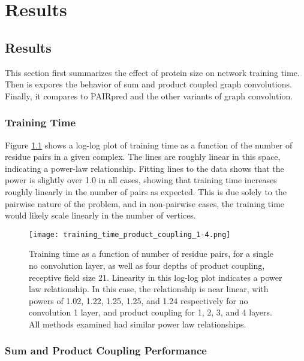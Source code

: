 \chapter{Results}
\label{chap:results}





\section{Results}

This section first summarizes the effect of protein size on network training time.
Then is expores the behavior of sum and product coupled graph convolutions.
Finally, it compares to PAIRpred and the other variants of graph convolution.


\subsection{Training Time}

Figure \ref{fig:train_times} shows a log-log plot of training time as a function of the number of residue pairs in a given complex.
The lines are roughly linear in this space, indicating a power-law relationship.
Fitting lines to the data shows that the power is slightly over 1.0 in all cases, showing that training time increases roughly linearly in the number of pairs as expected.
This is due solely to the pairwise nature of the problem, and in non-pairwise cases, the training time would likely scale linearly in the number of vertices.


\begin{figure}
	\texttt{[image: training\_time\_product\_coupling\_1-4.png]}
	\caption{Training time as a function of number of residue pairs, for a single no convolution layer, as well as four depths of product coupling, receptive field size 21. Linearity in this log-log plot indicates a power law relationship. In this case, the relationship is near linear, with powers of 1.02, 1.22, 1.25, 1.25, and 1.24 respectively for no convolution 1 layer, and product coupling for 1, 2, 3, and 4 layers. All methods examined had similar power law relationships. 
		\label{fig:train_times}}
\end{figure}




\subsection{Sum and Product Coupling Performance}

